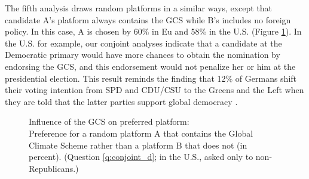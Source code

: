 The fifth analysis draws random platforms in a similar ways, except that candidate A's platform always contains the GCS while B's includes no foreign policy. In this case, A is chosen by 60\% in Eu %
and 58\% in the U.S. (Figure \ref{fig:conjoint_left_ag_b}). %
In the U.S. for example, our conjoint analyses indicate that a candidate at the Democratic primary would have more chances to obtain the nomination by endorsing the GCS, and this endorsement would not penalize her or him at the presidential election. This result reminds the finding that 12\% of Germans shift their voting intention from SPD and CDU/CSU to the Greens and the Left when they are told that the latter parties support global democracy \citep{ghassim_who_2020}.

\begin{figure}[h!]
    \caption[Influence of the GCS on preferred platform]{Influence of the GCS on preferred platform:\\ Preference for a random platform A that contains the Global Climate Scheme rather than a platform B that does not (in percent). (Question \ref{q:conjoint_d}; in the U.S., asked only to non-Republicans.)}\label{fig:conjoint_left_ag_b}
\end{figure}



